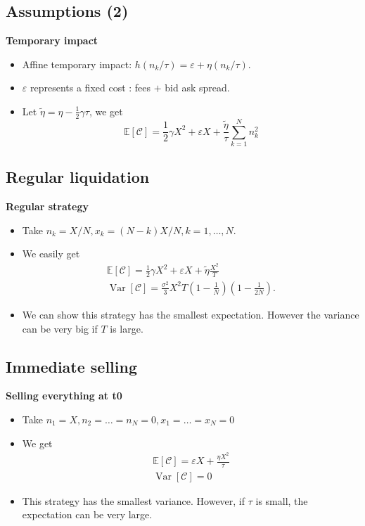 \documentclass[10pt]{article}
\begin{document}
\subsection{Assumptions (2)}

\textbf{Temporary impact}

\begin{itemize} 
    \item Affine temporary impact: $h\left(n_{k} / \tau\right)=\varepsilon+\eta\left(n_{k} / \tau\right)$.
    \item $\varepsilon$ represents a fixed cost : fees $+$ bid ask spread.
    \item Let $\tilde{\eta}=\eta-\frac{1}{2} \gamma \tau$, we get
    $$
    \mathbb{E}[\mathcal{C}]=\frac{1}{2} \gamma X^{2}+\varepsilon X+\frac{\tilde{\eta}}{\tau} \sum_{k=1}^{N} n_{k}^{2}
    $$
\end{itemize}

\subsection{Regular liquidation}

\textbf{Regular strategy}

\begin{itemize} 
    \item Take $n_{k}=X / N, x_{k}=(N-k) X / N, k=1, \ldots, N$.
    \item We easily get
    $$
    \begin{array}{l}
    \mathbb{E}[\mathcal{C}]=\frac{1}{2} \gamma X^{2}+\varepsilon X+\tilde{\eta} \frac{X^{2}}{T} \\
    \operatorname{Var}[\mathcal{C}]=\frac{\sigma^{2}}{3} X^{2} T\left(1-\frac{1}{N}\right)\left(1-\frac{1}{2 N}\right) .
    \end{array}
    $$
    \item We can show this strategy has the smallest expectation. However the variance can be very big if $T$ is large.
\end{itemize}

\subsection{Immediate selling}

\textbf{Selling everything at t0}

\begin{itemize} 
    \item Take $n_{1}=X, n_{2}=\ldots=n_{N}=0, x_{1}=\ldots=x_{N}=0$
    \item We get
    $$
    \begin{array}{l}
    \mathbb{E}[\mathcal{C}]=\varepsilon X+\frac{\eta X^{2}}{\tau} \\
    \operatorname{Var}[\mathcal{C}]=0
    \end{array}
    $$
    \item This strategy has the smallest variance. However, if $\tau$ is small, the expectation can be very large.
\end{itemize}
\end{document}
